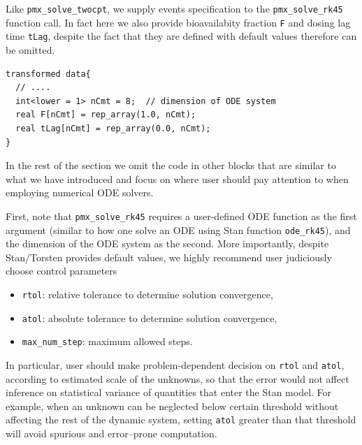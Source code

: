 Like \texttt{pmx\_solve\_twocpt}, we supply events specification to the \texttt{pmx\_solve\_rk45} function call.
In fact here we also provide bioavailabity fraction \texttt{F} and dosing lag
time \texttt{tLag}, despite the fact that they are defined with default values
therefore can be omitted.
\begin{lstlisting}[style=stan, numbers=none] 
transformed data{
  // ....
  int<lower = 1> nCmt = 8;  // dimension of ODE system
  real F[nCmt] = rep_array(1.0, nCmt);
  real tLag[nCmt] = rep_array(0.0, nCmt);
}
\end{lstlisting}
In the rest of the section we omit the code in other blocks that are similar to what we have
introduced and focus on where user should pay attention to when employing numerical ODE solvers.

First, note that \texttt{pmx\_solve\_rk45}
requires a user-defined ODE function as the first argument (similar to
how one solve an ODE using Stan function \texttt{ode\_rk45}),
and the dimension of the ODE system as the second. More importantly,
despite Stan/Torsten provides default values, we highly recommend user
judiciously choose control parameters
\begin{itemize}
\item \texttt{rtol}: relative tolerance to determine solution convergence,
\item \texttt{atol}: absolute tolerance to determine solution convergence,
\item \texttt{max\_num\_step}: maximum allowed steps.
\end{itemize}
In particular, user should make problem-dependent decision on \texttt{rtol} and \texttt{atol},
according to estimated scale of the unknowns, so that the error would
not affect inference on statistical variance of quantities that enter
the Stan model. For example, when an unknown can be neglected below
certain threshold without affecting the rest of the dynamic system,
setting \texttt{atol} greater than that threshold will avoid spurious and
error--prone computation.

